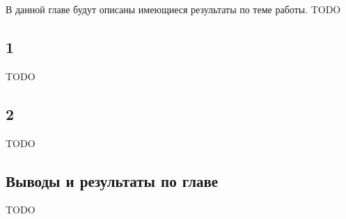 \documentclass[../diploma.tex]{subfiles}
\begin{document}
 \label{sec:domain_review}

В данной главе будут описаны имеющиеся результаты по теме работы. TODO

\subsection{1}

TODO

\subsection{2}

TODO

\subsection{Выводы и результаты по главе}

TODO
\end{document}
